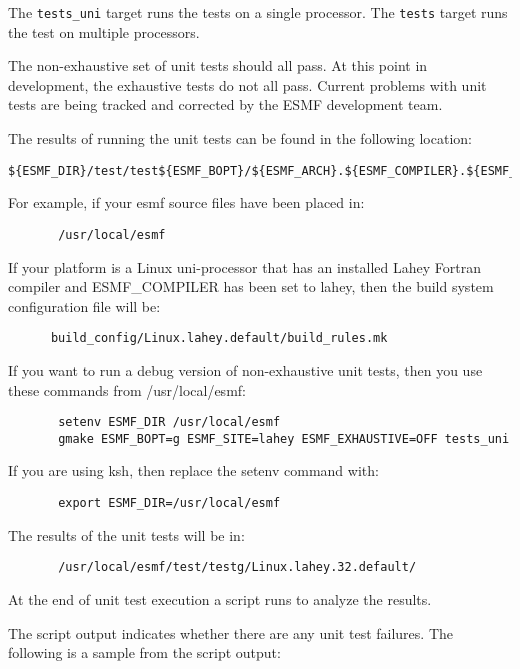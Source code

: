 The {\tt tests\_uni} target runs the tests on a single processor. 
The {\tt tests} target runs the test on multiple processors.

The non-exhaustive set of unit tests should all pass.  At this point in 
development, the exhaustive tests do not all pass.  Current problems with 
unit tests are being tracked and corrected by the ESMF development team.

The results of running the unit tests can be found in the following location:
\begin{verbatim}
${ESMF_DIR}/test/test${ESMF_BOPT}/${ESMF_ARCH}.${ESMF_COMPILER}.${ESMF_PREC}.${ESMF_SITE}
\end{verbatim}

For example, if your esmf source files have been placed in: 
\begin{verbatim}
       /usr/local/esmf
\end{verbatim}

If your platform is a Linux uni-processor that has an installed Lahey
Fortran compiler and ESMF\_COMPILER has been set to lahey, then the build
system configuration file will be:

\begin{verbatim}
      build_config/Linux.lahey.default/build_rules.mk
\end{verbatim}

If you want to run a debug version of non-exhaustive unit tests,
then you use these commands from /usr/local/esmf:

\begin{verbatim}
       setenv ESMF_DIR /usr/local/esmf
       gmake ESMF_BOPT=g ESMF_SITE=lahey ESMF_EXHAUSTIVE=OFF tests_uni
\end{verbatim}


If you are using ksh, then replace the setenv command with:
\begin{verbatim}
       export ESMF_DIR=/usr/local/esmf
\end{verbatim}

The results of the unit tests will be in:
\begin{verbatim}
       /usr/local/esmf/test/testg/Linux.lahey.32.default/
\end{verbatim}

At the end of unit test execution a script runs to analyze the results.

The script output indicates whether there are any unit test failures.
The following is a sample from the script output:

